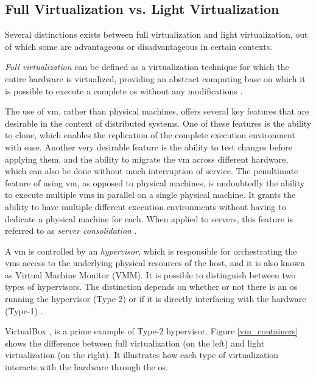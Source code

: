 \documentclass[12pt, titlepage]{uo_temp}
\begin{document}
     \subsection{Full Virtualization vs. Light Virtualization} 
     Several distinctions exists between full virtualization and light
     virtualization, out of which some are advantageous or disadvantageous in certain
     contexts.

     \emph{Full virtualization} can be defined as a virtualization technique for which the
     entire hardware is virtualized, providing an abstract computing base on which it is
     possible to execute a complete \gls{os} without any modifications
     \cite{barham2003xen}.

     The use of \gls{vm}, rather than physical machines, offers several key features that
     are desirable in the context of distributed systems. One of these features is the
     ability to clone, which enables the replication of the complete execution environment
     with ease.  Another very desirable feature is the ability to test changes before
     applying them, and the ability to migrate the \gls{vm} across different hardware,
     which can also be done without much interruption of service. The penultimate feature
     of using \gls{vm}, as opposed to physical machines, is undoubtedly the ability to
     execute multiple \gls{vm}s in parallel on a single physical machine. It grants the
     ability to have multiple different execution environments without having to dedicate
     a physical machine for each. When applied to servers, this feature is referred to as
     \emph{server consolidation} \cite{tavangarian2012virtual}.

     A \gls{vm} is controlled by an \emph{hypervisor}, which is responsible for
     orchestrating the \gls{vm}s access to the underlying physical resources of the host,
     and it is also known as Virtual Machine Monitor (VMM). It is possible to distinguish
     between two types of hypervisors. The distinction depends on whether or not there is
     an \gls{os} running the hypervisor (Type-2) or if it is directly interfacing with the
     hardware (Type-1) \cite{popek1974formal}.

     VirtualBox \cite{watson2008virtualbox}, is a prime example of Type-2 hypervisor.
     Figure \ref{vm_containers} shows the difference between full virtualization (on the
     left) and light virtualization (on the right). It illustrates how each type of
     virtualization interacts with the hardware through the \gls{os}.
     
\end{document}
